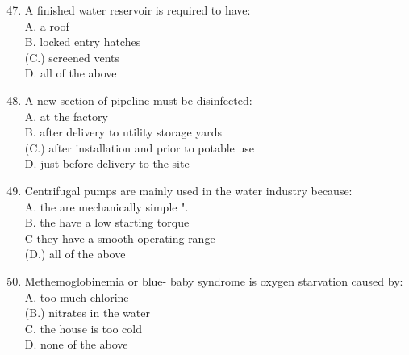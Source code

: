 \documentclass[10pt]{article}
\begin{document}
\begin{enumerate}
  \setcounter{enumi}{46}
  \item A finished water reservoir is required to have:\\
A. a roof\\
B. locked entry hatches\\
(C.) screened vents\\
D. all of the above

  \item A new section of pipeline must be disinfected:\\
A. at the factory\\
B. after delivery to utility storage yards\\
(C.) after installation and prior to potable use\\
D. just before delivery to the site

  \item Centrifugal pumps are mainly used in the water industry because:\\
A. the are mechanically simple ".\\
B. the have a low starting torque\\
$\mathrm{C}$ they have a smooth operating range\\
(D.) all of the above

  \item Methemoglobinemia or blue- baby syndrome is oxygen starvation caused by:\\
A. too much chlorine\\
(B.) nitrates in the water\\
C. the house is too cold\\
D. none of the above

\end{enumerate}
\end{document}
